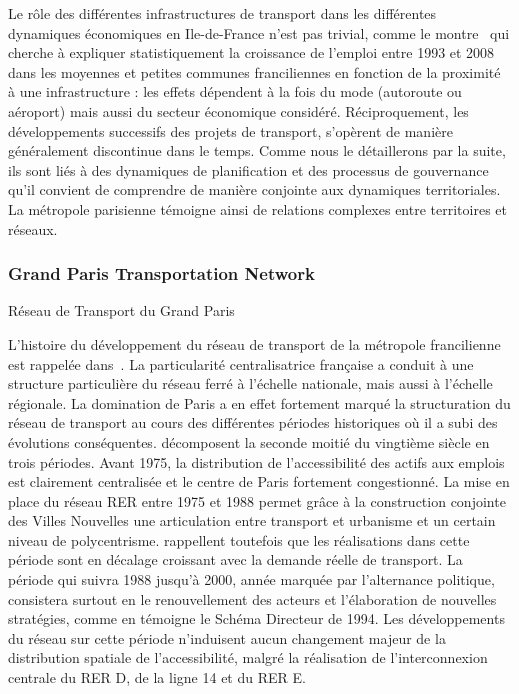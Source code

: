 Le rôle des différentes infrastructures de transport dans les différentes dynamiques économiques en Ile-de-France n'est pas trivial, comme le montre~\cite{PADEIRO201344} qui cherche à expliquer statistiquement la croissance de l'emploi entre 1993 et 2008 dans les moyennes et petites communes franciliennes en fonction de la proximité à une infrastructure : les effets dépendent à la fois du mode (autoroute ou aéroport) mais aussi du secteur économique considéré. Réciproquement, les développements successifs des projets de transport, s'opèrent de manière généralement discontinue dans le temps. Comme nous le détaillerons par la suite, ils sont liés à des dynamiques de planification et des processus de gouvernance qu'il convient de comprendre de manière conjointe aux dynamiques territoriales. La métropole parisienne témoigne ainsi de relations complexes entre territoires et réseaux.




\subsubsection{Grand Paris Transportation Network}{Réseau de Transport du Grand Paris}

L'histoire du développement du réseau de transport de la métropole francilienne est rappelée dans~\cite{larroque2002paris}. La particularité centralisatrice française a conduit à une structure particulière du réseau ferré à l'échelle nationale, mais aussi à l'échelle régionale. La domination de Paris a en effet fortement marqué la structuration du réseau de transport au cours des différentes périodes historiques où il a subi des évolutions conséquentes. \cite{larroque2002paris} décomposent la seconde moitié du vingtième siècle en trois périodes. Avant 1975, la distribution de l'accessibilité des actifs aux emplois est clairement centralisée et le centre de Paris fortement congestionné. La mise en place du réseau RER entre 1975 et 1988 permet grâce à la construction conjointe des Villes Nouvelles une articulation entre transport et urbanisme et un certain niveau de polycentrisme. \cite{larroque2002paris} rappellent toutefois que les réalisations dans cette période sont en décalage croissant avec la demande réelle de transport. La période qui suivra 1988 jusqu'à 2000, année marquée par l'alternance politique, consistera  surtout en le renouvellement des acteurs et l'élaboration de nouvelles stratégies, comme en témoigne le Schéma Directeur de 1994. Les développements du réseau sur cette période n'induisent aucun changement majeur de la distribution spatiale de l'accessibilité, malgré la réalisation de l'interconnexion centrale du RER D, de la ligne 14 et du RER E.


